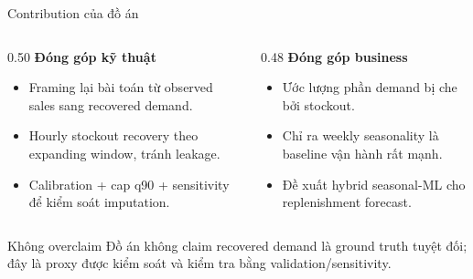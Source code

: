 \documentclass[aspectratio=169,10pt]{beamer}
\begin{document}
\begin{frame}{Contribution của đồ án}
    \begin{columns}[T]
        \begin{column}{0.50\linewidth}
            \textbf{Đóng góp kỹ thuật}
            \begin{itemize}
                \item Framing lại bài toán từ observed sales sang recovered demand.
                \item Hourly stockout recovery theo expanding window, tránh leakage.
                \item Calibration + cap q90 + sensitivity để kiểm soát imputation.
            \end{itemize}
        \end{column}
        \begin{column}{0.48\linewidth}
            \textbf{Đóng góp business}
            \begin{itemize}
                \item Ước lượng phần demand bị che bởi stockout.
                \item Chỉ ra weekly seasonality là baseline vận hành rất mạnh.
                \item Đề xuất hybrid seasonal-ML cho replenishment forecast.
            \end{itemize}
        \end{column}
    \end{columns}
    \vspace{0.2cm}
    \begin{block}{Không overclaim}
    Đồ án không claim recovered demand là ground truth tuyệt đối; đây là proxy được kiểm soát và kiểm tra bằng validation/sensitivity.
    \end{block}
\end{frame}
\end{document}
